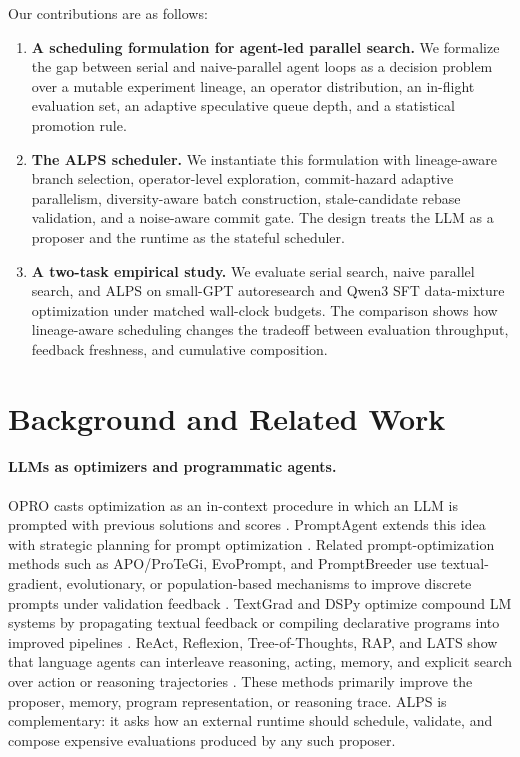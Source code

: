 \documentclass{article}
\newcommand{\alps}{ALPS\xspace}
\begin{document}
Our contributions are as follows:
\begin{enumerate}[leftmargin=*,itemsep=2pt]
  \item \textbf{A scheduling formulation for agent-led parallel search.}
  We formalize the gap between serial and naive-parallel agent loops as a decision problem over a mutable experiment lineage, an operator distribution, an in-flight evaluation set, an adaptive speculative queue depth, and a statistical promotion rule.

  \item \textbf{The \alps scheduler.}
  We instantiate this formulation with lineage-aware branch selection, operator-level exploration, commit-hazard adaptive parallelism, diversity-aware batch construction, stale-candidate rebase validation, and a noise-aware commit gate. The design treats the LLM as a proposer and the runtime as the stateful scheduler.

  \item \textbf{A two-task empirical study.}
  We evaluate serial search, naive parallel search, and \alps on small-GPT autoresearch and Qwen3 SFT data-mixture optimization under matched wall-clock budgets. The comparison shows how lineage-aware scheduling changes the tradeoff between evaluation throughput, feedback freshness, and cumulative composition.
\end{enumerate}
\section{Background and Related Work}
\label{sec:related}

\paragraph{LLMs as optimizers and programmatic agents.}
OPRO casts optimization as an in-context procedure in which an LLM is prompted with previous solutions and scores \citep{yang2023opro}. PromptAgent extends this idea with strategic planning for prompt optimization \citep{promptagent}. Related prompt-optimization methods such as APO/ProTeGi, EvoPrompt, and PromptBreeder use textual-gradient, evolutionary, or population-based mechanisms to improve discrete prompts under validation feedback \citep{protegi,evoprompt,promptbreeder}. TextGrad and DSPy optimize compound LM systems by propagating textual feedback or compiling declarative programs into improved pipelines \citep{textgrad,dspy}. ReAct, Reflexion, Tree-of-Thoughts, RAP, and LATS show that language agents can interleave reasoning, acting, memory, and explicit search over action or reasoning trajectories \citep{react,reflexion,yao2023tree,rap,lats}. These methods primarily improve the proposer, memory, program representation, or reasoning trace. \alps is complementary: it asks how an external runtime should schedule, validate, and compose expensive evaluations produced by any such proposer.
\end{document}
